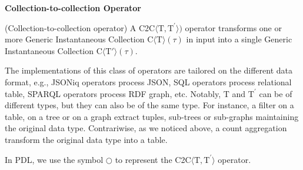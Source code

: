 \medskip
\noindent
\textbf{Collection-to-collection Operator}
\medskip

\begin{Definition}
(Collection-to-collection operator) A C2C$\langle\mathrm{T},\mathrm{T^{\prime}}\rangle)$ operator transforms one or more Generic Instantaneous Collection C$\langle\mathrm{T}\rangle(\tau)$ in input into a single Generic Instantaneous Collection C$\langle\mathrm{T'}\rangle(\tau)$.
\end{Definition}

The implementations of this class of operators are tailored on the different data format, e.g., JSONiq operators process  JSON,  SQL operators process relational table, SPARQL operators process RDF graph, etc. Notably, $\mathrm{T}$ and $\mathrm{T^{\prime}}$ can be of different types, but they can also be of the same type. For instance, a filter on a table, on a tree or on a graph extract tuples, sub-trees or sub-graphs maintaining the original data type. Contrariwise, as we noticed above, a count aggregation transform the original data type into a table.

\noindent
In PDL, we use the symbol $\bigcirc$ to represent the C2C$\langle\mathrm{T},\mathrm{T^{\prime}}\rangle$ operator.

